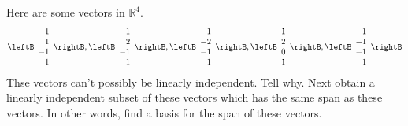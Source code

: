 \begin{enumialphparenastyle}
\begin{ex} Here are some vectors in $\mathbb{R}^{4}$. 
\begin{equation*}
\leftB 
\begin{array}{r}
1 \\ 
1 \\ 
-1 \\ 
1
\end{array}
\rightB ,\leftB 
\begin{array}{r}
1 \\ 
2 \\ 
-1 \\ 
1
\end{array}
\rightB ,\leftB 
\begin{array}{r}
1 \\ 
-2 \\ 
-1 \\ 
1
\end{array}
\rightB ,\leftB 
\begin{array}{r}
1 \\ 
2 \\ 
0 \\ 
1
\end{array}
\rightB ,\leftB 
\begin{array}{r}
1 \\ 
-1 \\ 
-1 \\ 
1
\end{array}
\rightB
\end{equation*}
Thse vectors can't possibly be linearly independent. Tell why. Next obtain a
linearly independent subset of these vectors which has the same span as
these vectors. In other words, find a basis for the span of these vectors.
\end{ex}


\end{enumialphparenastyle}
